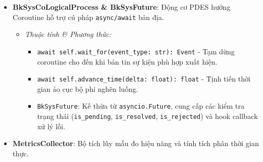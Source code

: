 \begin{itemize}[leftmargin=1.5em, itemsep=8pt]
\begin{itemize}[leftmargin=1.2em, label={}, itemsep=3pt]
\item[\textendash] \textit{Phương thức tĩnh:}
\begin{itemize}[leftmargin=1.5em, label=+, itemsep=2pt]
\item \texttt{run\_with\_task\_group(coroutines: Sequence): List[Any]} - Quản lý tác vụ cấu trúc (\textit{Structured Concurrency}) qua \texttt{asyncio.TaskGroup}.
\item \texttt{run\_with\_gather(coroutines: Sequence): List[Any]} - Thu gom kết quả song song hàng loạt qua \texttt{asyncio.gather}.
\item \texttt{process\_as\_completed(coroutines, callback)}: Trả về kết quả ngay khi từng tác vụ riêng lẻ hoàn tất theo nguyên tắc FCFS qua \texttt{asyncio.as\_completed}.
\item \texttt{run\_in\_runner(main\_coro: Coroutine): Any} - Điểm khởi động chương trình với bộ thực thi \texttt{asyncio.Runner} cô lập.
\end{itemize}
\end{itemize}

\item \textbf{BkSysCoLogicalProcess \& BkSysFuture}: Động cơ PDES hướng Coroutine hỗ trợ cú pháp \texttt{async/await} bản địa.

\begin{itemize}[leftmargin=1.2em, label={}, itemsep=3pt]
\item[\textendash] \textit{Thuộc tính \& Phương thức:}
\begin{itemize}[leftmargin=1.5em, label=+, itemsep=2pt]
\item \texttt{await self.wait\_for(event\_type: str): Event} - Tạm dừng coroutine cho đến khi bản tin sự kiện phù hợp xuất hiện.
\item \texttt{await self.advance\_time(delta: float): float} - Tịnh tiến thời gian ảo cục bộ phi nghẽn luồng.
\item \texttt{BkSysFuture}: Kế thừa từ \texttt{asyncio.Future}, cung cấp các kiểm tra trạng thái (\texttt{is\_pending}, \texttt{is\_resolved}, \texttt{is\_rejected}) và hook callback xử lý lỗi.
\end{itemize}
\end{itemize}

\item \textbf{MetricsCollector}: Bộ tích lũy mẫu đo hiệu năng và tính tích phân thời gian thực.


\end{itemize}
